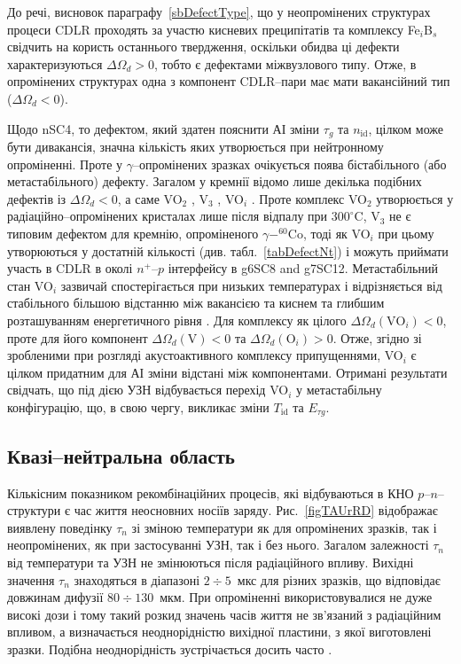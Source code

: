 До речі, висновок параграфу~\ref{sbDefectType}, що
у неопромінених структурах процеси CDLR проходять за участю кисневих преципітатів та комплексу Fe$_i$B$_s$ свідчить на користь
останнього твердження, оскільки обидва ці дефекти характеризуються $\Delta\Omega_d>0$, тобто є дефектами міжвузлового типу.
Отже, в опромінених структурах одна з компонент CDLR--пари
має мати вакансійний тип ($\Delta\Omega_d<0$).

Щодо nSC4, то дефектом, який здатен пояснити АІ зміни $\tau_g$ та $n_\mathrm{id}$, цілком може бути дивакансія,
значна кількість яких утворюється при нейтронному опроміненні.
Проте у $\gamma$--опромінених зразках очікується поява бістабільного (або метастабільного) дефекту.
Загалом у кремнії відомо лише декілька подібних дефектів із $\Delta\Omega_d<0$, а саме
 VO$_2$ \cite{FTP:Murin},
 V$_3$ \cite{V3:Markevich},
 VO$_i$ \cite{MetaUFN}.
Проте комплекс VO$_2$ утворюється у радіаційно--опромінених кристалах лише після відпалу при $300^\circ$C,
V$_3$ не є типовим дефектом для кремнію, опроміненого $\gamma-^{60}$Co,
тоді як VO$_i$ при цьому утворюються у достатній кількості (див. табл.~\ref{tabDefectNt}) і можуть приймати
участь в CDLR в околі $n^+$--$p$ інтерфейсу в g6SC8 and g7SC12.
Метастабільний стан VO$_i$ зазвичай спостерігається при низьких температурах
і відрізняється від стабільного більшою відстанню між вакансією та киснем та глибшим розташуванням енергетичного рівня \cite{MetaUFN}.
Для комплексу як цілого $\Delta\Omega_d(\mbox{VO}_i)<0$,
проте для його компонент $\Delta\Omega_d(\mbox{V})<0$ та $\Delta\Omega_d(\mbox{O}_i)>0$.
Отже, згідно зі зробленими при розгляді акустоактивного комплексу припущеннями,
VO$_i$ є цілком придатним для АІ зміни відстані між компонентами.
Отримані результати свідчать, що під дією УЗН  відбувається
перехід VO$_i$ у метастабільну конфігурацію, що, в свою чергу,
викликає зміни $T_{\mathrm{id}}$ та $E_{\tau g}$.





\subsection{Квазі--нейтральна область\label{sbRadDef}}

Кількісним показником рекомбінаційних процесів, які відбуваються в КНО $p$--$n$--структури є
час життя неосновних носіїв заряду.
Рис.~\ref{figTAUrRD} відображає виявлену поведінку $\tau_n$ зі зміною температури як для опромінених зразків,
так і неопромінених, як при застосуванні УЗН, так і без нього.
Загалом залежності $\tau_n$ від температури та УЗН не змінюються після радіаційного впливу.
Вихідні значення $\tau_n$ знаходяться в діапазоні $2\div5$~мкс для різних зразків,
що відповідає довжинам дифузії $80\div130$~мкм.
При опроміненні використовувалися не дуже високі дози і тому
такий розкид значень часів життя не зв'язаний з радіаційним впливом,
а визначається неоднорідністю вихідної пластини, з якої виготовлені зразки.
Подібна неоднорідність зустрічається досить часто \cite{Oxide:Chen,Oxide_Schon}.


